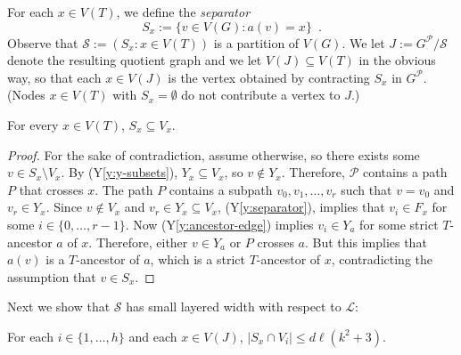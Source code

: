 \documentclass{patmorin}
\newcommand{\yref}[1]{(Y\ref{y:#1})}
\renewcommand{\le}{\leqslant}
\begin{document}
For each $x\in V(T)$, we define the \emph{separator}
\[  
     S_x := \{v\in V(G): a(v)= x\} \enspace .
\]
Observe that $\mathcal{S}:=(S_x : x\in V(T))$ is a partition of $V(G)$.  We let $J:=G^\mathcal{P}/\mathcal{S}$ denote the resulting quotient graph and we let $V(J)\subseteq V(T)$ in the obvious way, so that each $x\in V(J)$ is the vertex obtained by contracting $S_x$ in $G^{\mathcal{P}}$. (Nodes $x\in V(T)$ with $S_x=\emptyset$ do not contribute a vertex to $J$.)

\begin{clm}
  For every $x\in V(T)$, $S_x\subseteq V_x$.
\end{clm}

\begin{proof}
  For the sake of contradiction, assume otherwise, so there exists some $v\in S_x\setminus V_x$. By \yref{y-subsets}, $Y_x\subseteq V_x$, so $v\not\in Y_x$.  Therefore, $\mathcal{P}$ contains a path $P$ that crosses $x$.  The path $P$ contains a subpath $v_0,v_1,\ldots,v_{r}$ such that $v=v_0$ and $v_r\in Y_x$. Since $v\not\in V_x$ and $v_r\in Y_x\subseteq V_x$, \yref{separator}, implies that $v_i\in F_x$ for some $i\in\{0,\ldots,r-1\}$. Now \yref{ancestor-edge} implies $v_i\in Y_a$ for some strict $T$-ancestor $a$ of $x$.  Therefore, either $v\in Y_a$ or $P$ crosses $a$. But this implies that $a(v)$ is a $T$-ancestor of $a$, which is a strict $T$-ancestor of $x$, contradicting the assumption that $v\in S_x$.
\end{proof}

Next we show that $\mathcal{S}$ has small layered width with respect to $\mathcal{L}$:

\begin{clm}
  For each $i\in\{1,\ldots,h\}$ and each $x\in V(J)$, $|S_x\cap V_i|\le d\ell(k^2+3)$.  
\end{clm}
\end{document}
